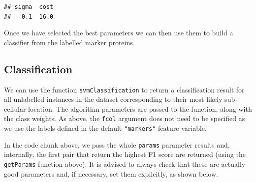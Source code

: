 \begin{knitrout}
\color{fgcolor}\begin{kframe}
\begin{alltt}
 \hlkwb{<-} 
\end{alltt}
\begin{verbatim}
## sigma  cost 
##   0.1  16.0
\end{verbatim}
\end{kframe}
\end{knitrout}

Once we have selected the best parameters we can then use them to
build a classifier from the labelled marker proteins.


\subsection*{Classification}

We can use the function \texttt{svmClassification} to return a
classification result for all unlabelled instances in the dataset
corresponding to their most likely sub-cellular location. The
algorithm parameters are passed to the function, along with the class
weights. As above, the \texttt{fcol} argument does not need to be
specified as we use the labels defined in the default
\texttt{"markers"} feature variable.


\begin{knitrout}
\color{fgcolor}\begin{kframe}
\begin{alltt}
 \hlkwb{<-}     \hlstd{=} \hlstd{)}
\end{alltt}
\end{kframe}
\end{knitrout}

In the code chunk above, we pass the whole \texttt{params} parameter
results and, internally, the first pair that return the highest F1
score are returned (using the \texttt{getParams} function above). It
is advised to always check that these are actually good parameters
and, if necessary, set them explicitly, as shown below.

\begin{knitrout}
\color{fgcolor}\begin{kframe}
\begin{alltt}
 \hlkwb{<-}   \hlstd{=} \hlstd{,}  \hlstd{=} \hlstd{,}    \hlstd{=} \hlstd{)}
\end{alltt}
\end{kframe}
\end{knitrout}


